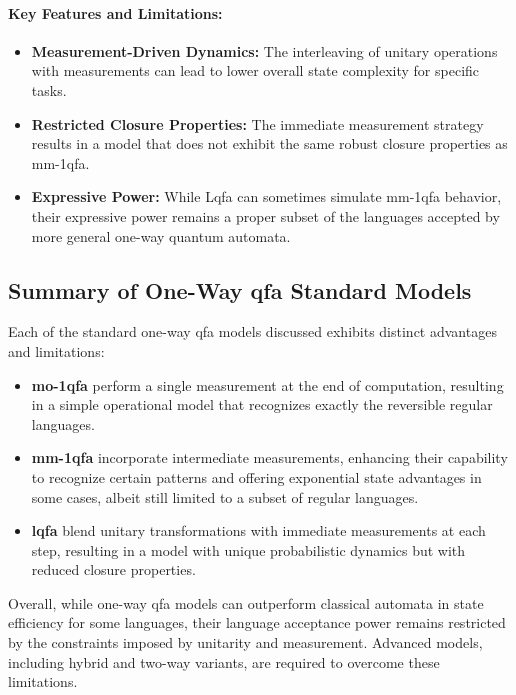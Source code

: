 \paragraph{Key Features and Limitations:}
\begin{itemize}
    \item \textbf{Measurement-Driven Dynamics:} The interleaving of unitary operations with measurements can lead to lower overall state complexity for specific tasks.
    \item \textbf{Restricted Closure Properties:} The immediate measurement strategy results in a model that does not exhibit the same robust closure properties as \gls{mm-1qfa}.
    \item \textbf{Expressive Power:} While Lqfa can sometimes simulate \gls{mm-1qfa} behavior, their expressive power remains a proper subset of the languages accepted by more general one-way quantum automata.
\end{itemize}

\subsection*{Summary of One-Way qfa Standard Models}
Each of the standard one-way \gls{qfa} models discussed exhibits distinct advantages and limitations:
\begin{itemize}
    \item \textbf{\gls{mo-1qfa}} perform a single measurement at the end of computation, resulting in a simple operational model that recognizes exactly the reversible regular languages.
    \item \textbf{\gls{mm-1qfa}} incorporate intermediate measurements, enhancing their capability to recognize certain patterns and offering exponential state advantages in some cases, albeit still limited to a subset of regular languages.
    \item \textbf{\gls{lqfa}} blend unitary transformations with immediate measurements at each step, resulting in a model with unique probabilistic dynamics but with reduced closure properties.
\end{itemize}
Overall, while one-way \gls{qfa} models can outperform classical automata in state efficiency for some languages, their language acceptance power remains restricted by the constraints imposed by unitarity and measurement. Advanced models, including hybrid and two-way variants, are required to overcome these limitations.

